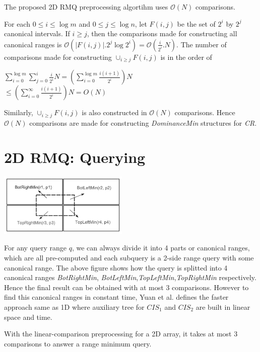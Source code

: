 \begin{theorem}
The proposed 2D RMQ preprocessing algortihm uses $\mathcal{O}(N)$ comparisons. 
\end{theorem}
For each $0 \leq i \leq \log m$ and $0 \leq j \leq \log n$, let $F(i, j)$ be the set of $2^i$ by $2^j$ canonical intervals. If $i \geq j$, then the comparisons made for constructing all canonical ranges is $\mathcal{O}(|F(i, j)|.2^j \log 2^i)=\mathcal{O}(\frac{i}{2^i}.N)$. The number of comparisons made for constructing $\cup _{i \geq j} F(i, j)$ is in the order of 
\begin{center}
$\sum \limits_{i=0}^{\log m} \sum \limits_{j=0}^{i} \frac{i}{2^i}N=(\sum \limits_{i=0}^{\log m} \frac{i(i+1)}{2^i})N$ \\
$\leq (\sum \limits_{i=0}^{\infty} \frac{i(i+1)}{2^i})N = O(N)$
\end{center}
Similarly, $\cup _{i \geq j} F(i, j)$ is also constructed in $\mathcal{O}(N)$ comparisons. Hence $\mathcal{O}(N)$ comparisons are made for constructing \emph{DominanceMin} structures for \emph{CR}.


\section{2D RMQ: Querying}
\begin{center}
\includegraphics[height=3cm,]{img/yuan2d.png}

\end{center}

For any query range $q$, we can always divide it into 4 parts or canonical ranges, which are all pre-computed and each subquery is a 2-side range query with some canonical range. The above figure shows how the query is splitted into 4 canonical ranges \emph{BotRightMin}, \emph{BotLeftMin},\emph{TopLeftMin},\emph{TopRightMin} respectively.
Hence the final result can be obtained with at most 3 comparisons. However to find this canonical ranges in constant time, Yuan et al. defines the faster approach same as 1D where auxiliary tree for $CIS_1$ and $CIS_2$ are built in linear space and time. \\
\begin{theorem}
With the linear-comparison preprocessing for a 2D array, it takes at most 3 comparisons to answer a range minimum query.
\end{theorem}